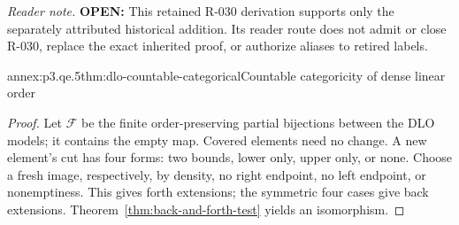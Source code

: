 \noindent\textit{Reader note.} \textbf{OPEN:} This retained R-030 derivation
supports only the separately attributed historical addition.  Its reader
route does not admit or close R-030, replace the exact inherited proof, or
authorize aliases to retired labels.

\begin{annexitem}{annex:p3.qe.5}{thm:dlo-countable-categorical}{Countable categoricity of dense linear order}
\begin{proof}
Let \(\mathcal F\) be the finite order-preserving partial bijections between the DLO models; it contains the empty map.
Covered elements need no change.  A new element's cut has four forms: two bounds, lower only, upper only, or none.
Choose a fresh image, respectively, by density, no right endpoint, no left endpoint, or nonemptiness.
This gives forth extensions; the symmetric four cases give back extensions.
Theorem~\ref{thm:back-and-forth-test} yields an isomorphism.
\end{proof}
\end{annexitem}
